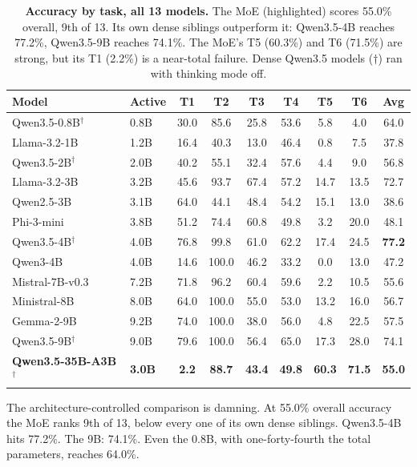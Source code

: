 \documentclass[11pt]{article}
\begin{document}
\begin{table}[t]
\centering
\caption{\textbf{Accuracy by task, all 13 models.} The MoE (highlighted) scores 55.0\% overall, 9th of 13.  Its own dense siblings outperform it: Qwen3.5-4B reaches 77.2\%, Qwen3.5-9B reaches 74.1\%.  The MoE's T5 (60.3\%) and T6 (71.5\%) are strong, but its T1 (2.2\%) is a near-total failure.  Dense Qwen3.5 models ($\dagger$) ran with thinking mode off.}
\label{tab:accuracy-comparison}
\small
\begin{tabular}{ll cccccc c}
\toprule
\textbf{Model} & \textbf{Active} & \textbf{T1} & \textbf{T2} & \textbf{T3} & \textbf{T4} & \textbf{T5} & \textbf{T6} & \textbf{Avg} \\
\midrule
Qwen3.5-0.8B$^\dagger$ & 0.8B & 30.0 & 85.6 & 25.8 & 53.6 & 5.8 & 4.0 & 64.0 \\
Llama-3.2-1B & 1.2B & 16.4 & 40.3 & 13.0 & 46.4 & 0.8 & 7.5 & 37.8 \\
Qwen3.5-2B$^\dagger$ & 2.0B & 40.2 & 55.1 & 32.4 & 57.6 & 4.4 & 9.0 & 56.8 \\
Llama-3.2-3B & 3.2B & 45.6 & 93.7 & 67.4 & 57.2 & 14.7 & 13.5 & 72.7 \\
Qwen2.5-3B & 3.1B & 64.0 & 44.1 & 48.4 & 54.2 & 15.1 & 13.0 & 38.6 \\
Phi-3-mini & 3.8B & 51.2 & 74.4 & 60.8 & 49.8 & 3.2 & 20.0 & 48.1 \\
Qwen3.5-4B$^\dagger$ & 4.0B & 76.8 & 99.8 & 61.0 & 62.2 & 17.4 & 24.5 & \textbf{77.2} \\
Qwen3-4B & 4.0B & 14.6 & 100.0 & 46.2 & 33.2 & 0.0 & 13.0 & 47.2 \\
Mistral-7B-v0.3 & 7.2B & 71.8 & 96.2 & 60.4 & 59.6 & 2.2 & 10.5 & 55.6 \\
Ministral-8B & 8.0B & 64.0 & 100.0 & 55.0 & 53.0 & 13.2 & 16.0 & 56.7 \\
Gemma-2-9B & 9.2B & 74.0 & 100.0 & 38.0 & 56.0 & 4.8 & 22.5 & 57.5 \\
Qwen3.5-9B$^\dagger$ & 9.0B & 79.6 & 100.0 & 56.4 & 65.0 & 17.3 & 28.0 & 74.1 \\
\midrule
\rowcolor{moepurple!8}
\textbf{Qwen3.5-35B-A3B}$^\dagger$ & \textbf{3.0B} & \textbf{2.2} & \textbf{88.7} & \textbf{43.4} & \textbf{49.8} & \textbf{60.3} & \textbf{71.5} & \textbf{55.0} \\
\bottomrule
\end{tabular}
\end{table}

The architecture-controlled comparison is damning.  At 55.0\% overall accuracy the MoE ranks 9th of 13, below every one of its own dense siblings.  Qwen3.5-4B hits 77.2\%.  The 9B: 74.1\%.  Even the 0.8B, with one-forty-fourth the total parameters, reaches 64.0\%.
\end{document}
